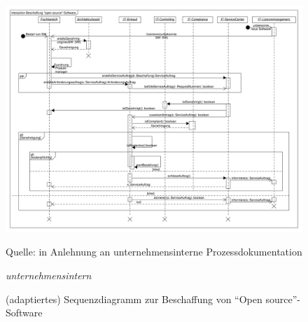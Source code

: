 \begin{figure}[H]
	\centering
	\includegraphics[scale=0.32]{img/prozessFreewareBeschaffung.pdf}
	\caption{(adaptiertes) Sequenzdiagramm zur Beschaffung von \enquote{Open source}-Software}
	{\footnotesize Quelle: in Anlehnung an unternehmensinterne Prozessdokumentation \par \textit{unternehmensintern}}
	\label{abb:pFW}
\end{figure}

